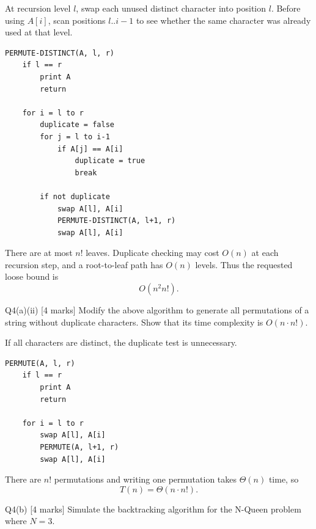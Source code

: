 \documentclass[10.5pt,a4paper]{article}
\begin{document}
\begin{answerbox}
At recursion level \(l\), swap each unused distinct character into position \(l\). Before using \(A[i]\), scan positions \(l..i-1\) to see whether the same character was already used at that level.

\begin{verbatim}
PERMUTE-DISTINCT(A, l, r)
    if l == r
        print A
        return

    for i = l to r
        duplicate = false
        for j = l to i-1
            if A[j] == A[i]
                duplicate = true
                break

        if not duplicate
            swap A[l], A[i]
            PERMUTE-DISTINCT(A, l+1, r)
            swap A[l], A[i]
\end{verbatim}

There are at most \(n!\) leaves. Duplicate checking may cost \(O(n)\) at each recursion step, and a root-to-leaf path has \(O(n)\) levels. Thus the requested loose bound is
\[
\boxed{O(n^2 n!)}.
\]
\end{answerbox}

\begin{questionbox}{Q4(a)(ii) [4 marks]}
Modify the above algorithm to generate all permutations of a string without duplicate characters. Show that its time complexity is \(O(n\cdot n!)\).
\end{questionbox}

\begin{answerbox}
If all characters are distinct, the duplicate test is unnecessary.

\begin{verbatim}
PERMUTE(A, l, r)
    if l == r
        print A
        return

    for i = l to r
        swap A[l], A[i]
        PERMUTE(A, l+1, r)
        swap A[l], A[i]
\end{verbatim}

There are \(n!\) permutations and writing one permutation takes \(\Theta(n)\) time, so
\[
\boxed{T(n)=\Theta(n\cdot n!)}.
\]
\end{answerbox}

\begin{questionbox}{Q4(b) [4 marks]}
Simulate the backtracking algorithm for the N-Queen problem where \(N=3\).
\end{questionbox}
\end{document}
